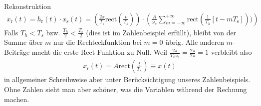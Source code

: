 \begin{Loesung}
\noindent Rekonstruktion
\begin{align}
x_\mathrm{r}(t) = h_\mathrm{r}(t) \cdot x_\mathrm{s}(t) =
\left(\frac{2\pi}{T_s}\mathrm{rect}(\frac{t}{T_s})\right) \cdot
\left(\frac{A}{\omega_s} \sum_{m=-\infty}^{+\infty} \mathrm{rect}(\frac{1}{T_h}[t - m T_\mathrm{s}]))\right)
\end{align}
Falls $T_h < T_s$ bzw. $\frac{T_h}{2} < \frac{T_s}{2}$
(dies ist im Zahlenbeispiel erfüllt),
bleibt von der Summe über $m$ nur die Rechteckfunktion bei $m=0$ übrig.
Alle anderen $m$-Beiträge macht die erste Rect-Funktion zu Null.
%
Weil $\frac{2\pi}{T_s \omega_s} = \frac{2\pi}{2\pi} = 1$ verbleibt also
\begin{align}
x_\mathrm{r}(t) = A \mathrm{rect}(\frac{t}{T_h}) \equiv x(t)
\end{align}
in allgemeiner Schreibweise aber unter Berücksichtigung unseres Zahlenbeispiels.
Ohne Zahlen sieht man aber schöner, was die Variablen während der Rechnung machen.


\end{Loesung}
